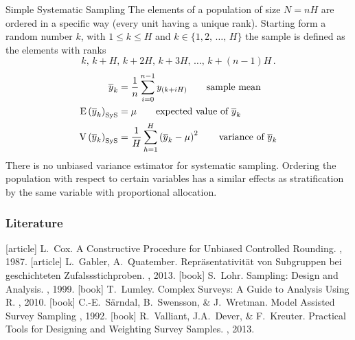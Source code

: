 \documentclass[10pt]{beamer}\usepackage[]{graphicx}\usepackage[]{color}
\newcommand{\eqname}[1]{\tag*{#1}} %
\newcommand{\E}[1]{\text{E}\left(#1\right)}
\newcommand{\V}[1]{\text{V}\left(#1\right)}
\begin{document}
\begin{frame}{Simple Systematic Sampling}
 The elements of a population of size $N=n H$ are ordered in a specific way (every unit having a unique rank).
 Starting form a random number $k$, with $1 \leq k \leq H$ and $ k\in \{ 1{,}2{,}\,\ldots{,}\,H \}$ the sample is defined as the elements with ranks 
 $$k{,}\, k+H{,}\, k+2H{,}\,k+3H{,}\,\ldots{,}\, k+(n-1)H\,{.}$$
\begin{align*}
\overline{y}_{k} & = \dfrac{1}{n} \sum_{i=0}^{n-1} y_{(k+iH)}   \eqname{sample mean}        \\
 \E{\overline{y}_{k}}_{\text{SyS}} &= \mu  \eqname{expected value of $\overline{y}_{k}$} \\
 \V{\overline{y}_{k}}_{\text{SyS}} &=  \dfrac{1}{H} \sum_{h=1}^H \left( \overline{y}_{k} - \mu  \right)^2  \eqname{variance of $\overline{y}_{k}$}
\end{align*}
There is no unbiased variance estimator for systematic sampling.
Ordering the population with respect to certain variables has a 
similar effects as stratification by the same variable with proportional allocation.
\end{frame}


\begin{frame}[allowframebreaks]\frametitle{Literature}    
  \begin{thebibliography}{10}    
  [article]
    L.~Cox.
    \newblock  A Constructive Procedure for Unbiased Controlled Rounding.
    , 1987.
  [article]
    L.~Gabler, A.~Quatember.
    \newblock  Repr\"{a}sentativit\"{a}t von Subgruppen bei geschichteten Zufalssstichproben.
    , 2013.
  [book]
    S.~Lohr.
    \newblock  Sampling: Design and Analysis.
    , 1999.
  [book]
    T.~Lumley.
    \newblock Complex Surveys: A Guide to Analysis Using R.
    , 2010.
  [book]
    C.-E.~S\"{a}rndal, B.~Swensson, \& J.~Wretman.
    \newblock Model Assisted Survey Sampling
    , 1992.
  [book]
   R.~Valliant, J.A.~Dever, \& F.~Kreuter.
  \newblock  Practical Tools for Designing and Weighting Survey Samples.
    , 2013.
  \end{thebibliography}
\end{frame} 
\end{document}
